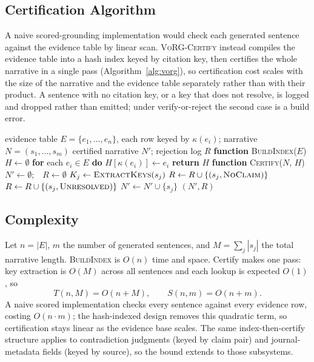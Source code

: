 \documentclass[conference]{IEEEtran}
\begin{document}
\subsection{Certification Algorithm}
A naive scored-grounding implementation would check each generated sentence
against the evidence table by linear scan. \textsc{VoRG-Certify} instead compiles
the evidence table into a hash index keyed by citation key, then certifies the
whole narrative in a single pass (Algorithm~\ref{alg:vorg}), so certification
cost scales with the size of the narrative and the evidence table separately
rather than with their product. A sentence with no citation key, or a key that
does not resolve, is logged and dropped rather than emitted; under
verify-or-reject the second case is a build error.

\begin{algorithm}[t]
\caption{\textsc{VoRG-Certify}}
\label{alg:vorg}
\begin{algorithmic}[1]
\REQUIRE evidence table $E=\{e_1,\dots,e_n\}$, each row keyed by $\kappa(e_i)$;
narrative $N=(s_1,\dots,s_m)$
\ENSURE certified narrative $N'$; rejection log $R$
\STATE \textbf{function} \textsc{BuildIndex}($E$)
\STATE \quad $H \gets \emptyset$
\STATE \quad \textbf{for} each $e_i \in E$ \textbf{do} $H[\kappa(e_i)] \gets e_i$ 
\STATE \quad \textbf{return} $H$
\STATE \textbf{function} \textsc{Certify}($N$, $H$)
\STATE \quad $N' \gets \emptyset$;\ \ $R \gets \emptyset$
  \STATE $K_j \gets \textsc{ExtractKeys}(s_j)$ 
     \STATE $R \gets R \cup \{(s_j,\textsc{NoClaim})\}$
     \STATE $R \gets R \cup \{(s_j,\textsc{Unresolved})\}$ 
  \ELSE
     \STATE $N' \gets N' \cup \{s_j\}$
  \ENDIF
\ENDFOR
\RETURN $(N',R)$
\end{algorithmic}
\end{algorithm}

\subsection{Complexity}
Let $n=|E|$, $m$ the number of generated sentences, and $M=\sum_j |s_j|$ the
total narrative length. \textsc{BuildIndex} is $O(n)$ time and space. Certify
makes one pass: key extraction is $O(M)$ across all sentences and each lookup is
expected $O(1)$, so
\[
T(n,M)=O(n+M),\qquad S(n,m)=O(n+m).
\]
A naive scored implementation checks every sentence against every evidence row,
costing $O(n\cdot m)$; the hash-indexed design removes this quadratic term, so
certification stays linear as the evidence base scales. The same
index-then-certify structure applies to contradiction judgments (keyed by claim
pair) and journal-metadata fields (keyed by source), so the bound extends to
those subsystems.
\end{document}
